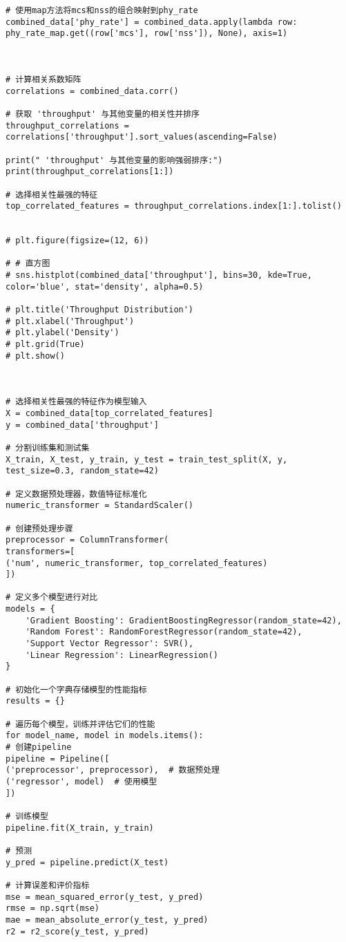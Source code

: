 \documentclass[bwprint,fontset=windows]{gmcmthesis}
\begin{document}
\begin{lstlisting}
# 使用map方法将mcs和nss的组合映射到phy_rate
combined_data['phy_rate'] = combined_data.apply(lambda row: phy_rate_map.get((row['mcs'], row['nss']), None), axis=1)



# 计算相关系数矩阵
correlations = combined_data.corr()

# 获取 'throughput' 与其他变量的相关性并排序
throughput_correlations = correlations['throughput'].sort_values(ascending=False)

print(" 'throughput' 与其他变量的影响强弱排序:")
print(throughput_correlations[1:])

# 选择相关性最强的特征
top_correlated_features = throughput_correlations.index[1:].tolist()


# plt.figure(figsize=(12, 6))

# # 直方图
# sns.histplot(combined_data['throughput'], bins=30, kde=True, color='blue', stat='density', alpha=0.5)

# plt.title('Throughput Distribution')
# plt.xlabel('Throughput')
# plt.ylabel('Density')
# plt.grid(True)
# plt.show()



# 选择相关性最强的特征作为模型输入
X = combined_data[top_correlated_features]
y = combined_data['throughput']

# 分割训练集和测试集
X_train, X_test, y_train, y_test = train_test_split(X, y, test_size=0.3, random_state=42)

# 定义数据预处理器，数值特征标准化
numeric_transformer = StandardScaler()

# 创建预处理步骤
preprocessor = ColumnTransformer(
transformers=[
('num', numeric_transformer, top_correlated_features)
])

# 定义多个模型进行对比
models = {
	'Gradient Boosting': GradientBoostingRegressor(random_state=42),
	'Random Forest': RandomForestRegressor(random_state=42),
	'Support Vector Regressor': SVR(),
	'Linear Regression': LinearRegression()
}

# 初始化一个字典存储模型的性能指标
results = {}

# 遍历每个模型，训练并评估它们的性能
for model_name, model in models.items():
# 创建pipeline
pipeline = Pipeline([
('preprocessor', preprocessor),  # 数据预处理
('regressor', model)  # 使用模型
])

# 训练模型
pipeline.fit(X_train, y_train)

# 预测
y_pred = pipeline.predict(X_test)

# 计算误差和评价指标
mse = mean_squared_error(y_test, y_pred)
rmse = np.sqrt(mse)
mae = mean_absolute_error(y_test, y_pred)
r2 = r2_score(y_test, y_pred)


\end{lstlisting}
\end{document}

